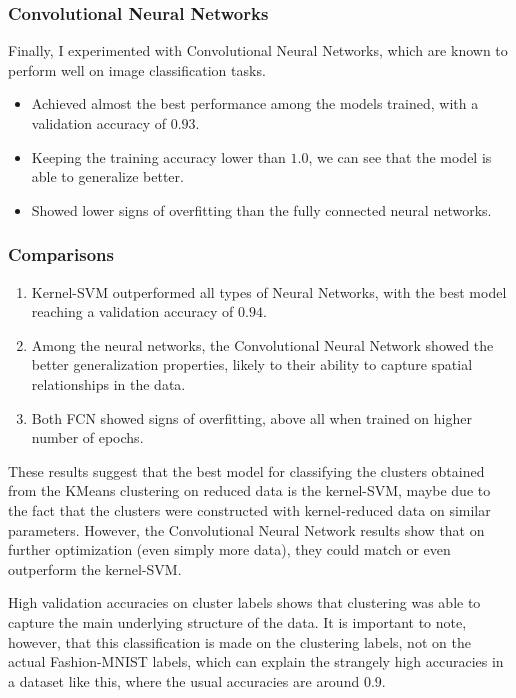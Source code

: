 \documentclass[a4paper, 10pt]{article}
\begin{document}
\subsubsection{Convolutional Neural Networks}
Finally, I experimented with Convolutional Neural Networks, which are known to perform well on image classification tasks.

\begin{itemize}
    \item Achieved almost the best performance among the models trained, with a validation accuracy of $0.93$.
    \item Keeping the training accuracy lower than $1.0$, we can see that the model is able to generalize better.
    \item Showed lower signs of overfitting than the fully connected neural networks.
\end{itemize}

\subsubsection{Comparisons}
\begin{enumerate}
    \item Kernel-SVM outperformed all types of Neural Networks, with the best model reaching a validation accuracy of $0.94$.
    \item Among the neural networks, the Convolutional Neural Network showed the better generalization properties, likely to their ability to capture spatial
    relationships in the data.
    \item Both FCN showed signs of overfitting, above all when trained on higher number of epochs.
\end{enumerate}

These results suggest that the best model for classifying the clusters obtained from the KMeans clustering on reduced data is the kernel-SVM, maybe due to the 
fact that the clusters were constructed with kernel-reduced data on similar parameters. However, the Convolutional Neural Network results show that on further optimization
(even simply more data), they could match or even outperform the kernel-SVM.

High validation accuracies on cluster labels shows that clustering was able to capture the main underlying structure of the data. It is important to note, however,
that this classification is made on the clustering labels, not on the actual Fashion-MNIST labels, which can explain the strangely high accuracies in a dataset like this,
where the usual accuracies are around $0.9$.
\end{document}
